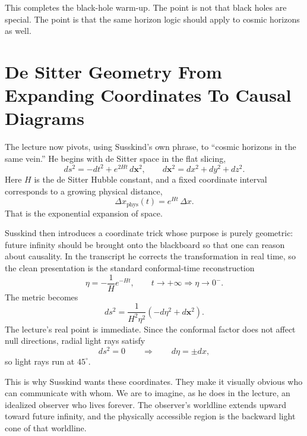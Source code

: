 This completes the black-hole warm-up. The point is not that black holes are special. The point is that the same horizon logic should apply to cosmic horizons as well.

\section{De Sitter Geometry From Expanding Coordinates To Causal Diagrams}

The lecture now pivots, using Susskind's own phrase, to ``cosmic horizons in the same vein.'' He begins with de Sitter space in the flat slicing,
\begin{equation}
ds^2=-dt^2+e^{2Ht}\,d\mathbf{x}^2,
\qquad
d\mathbf{x}^2=dx^2+dy^2+dz^2.
\end{equation}
Here \(H\) is the de Sitter Hubble constant, and a fixed coordinate interval corresponds to a growing physical distance,
\begin{equation}
\Delta x_{\text{phys}}(t)=e^{Ht}\,\Delta x.
\end{equation}
That is the exponential expansion of space.

Susskind then introduces a coordinate trick whose purpose is purely geometric: future infinity should be brought onto the blackboard so that one can reason about causality. In the transcript he corrects the transformation in real time, so the clean presentation is the standard conformal-time reconstruction
\begin{equation}
\eta=-\frac{1}{H}e^{-Ht},
\qquad
t\to +\infty \Longrightarrow \eta\to 0^-.
\end{equation}
The metric becomes
\begin{equation}
ds^2=\frac{1}{H^2\eta^2}\left(-d\eta^2+d\mathbf{x}^2\right).
\end{equation}
The lecture's real point is immediate. Since the conformal factor does not affect null directions, radial light rays satisfy
\begin{equation}
ds^2=0
\qquad\Longrightarrow\qquad
d\eta=\pm dx,
\end{equation}
so light rays run at \(45^\circ\).

This is why Susskind wants these coordinates. They make it visually obvious who can communicate with whom. We are to imagine, as he does in the lecture, an idealized observer who lives forever. The observer's worldline extends upward toward future infinity, and the physically accessible region is the backward light cone of that worldline.


